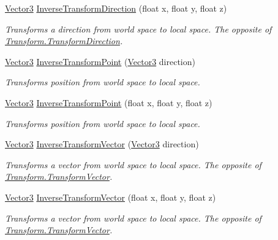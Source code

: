 \begin{DoxyCompactItemize}
\mbox{\hyperlink{class_lua_1_1_vector3}{Vector3}} \mbox{\hyperlink{class_lua_1_1_transform_a4983e88de730e650bb632f63d043035f}{Inverse\+Transform\+Direction}} (float x, float y, float z)
\begin{DoxyCompactList}\small\item\em Transforms a direction from world space to local space. The opposite of \mbox{\hyperlink{class_lua_1_1_transform_a14270ac6dbade453decf26513f533b66}{Transform.\+Transform\+Direction}}. \end{DoxyCompactList}\item 
\mbox{\hyperlink{class_lua_1_1_vector3}{Vector3}} \mbox{\hyperlink{class_lua_1_1_transform_aa32269bd79e72646057908fee2cb7f9e}{Inverse\+Transform\+Point}} (\mbox{\hyperlink{class_lua_1_1_vector3}{Vector3}} direction)
\begin{DoxyCompactList}\small\item\em Transforms position from world space to local space. \end{DoxyCompactList}\item 
\mbox{\hyperlink{class_lua_1_1_vector3}{Vector3}} \mbox{\hyperlink{class_lua_1_1_transform_af07e05c728e517c260e6cf8c1b442adc}{Inverse\+Transform\+Point}} (float x, float y, float z)
\begin{DoxyCompactList}\small\item\em Transforms position from world space to local space. \end{DoxyCompactList}\item 
\mbox{\hyperlink{class_lua_1_1_vector3}{Vector3}} \mbox{\hyperlink{class_lua_1_1_transform_ae6bb74c5b90a6f8db4c436a56f24f8eb}{Inverse\+Transform\+Vector}} (\mbox{\hyperlink{class_lua_1_1_vector3}{Vector3}} direction)
\begin{DoxyCompactList}\small\item\em Transforms a vector from world space to local space. The opposite of \mbox{\hyperlink{class_lua_1_1_transform_a8a4bb1f1feb42a0d3be3577e4463f5f4}{Transform.\+Transform\+Vector}}. \end{DoxyCompactList}\item 
\mbox{\hyperlink{class_lua_1_1_vector3}{Vector3}} \mbox{\hyperlink{class_lua_1_1_transform_a8922d01029a19d826eeb4d6f8f22ce06}{Inverse\+Transform\+Vector}} (float x, float y, float z)
\begin{DoxyCompactList}\small\item\em Transforms a vector from world space to local space. The opposite of \mbox{\hyperlink{class_lua_1_1_transform_a8a4bb1f1feb42a0d3be3577e4463f5f4}{Transform.\+Transform\+Vector}}. \end{DoxyCompactList}\item 

\end{DoxyCompactItemize}
